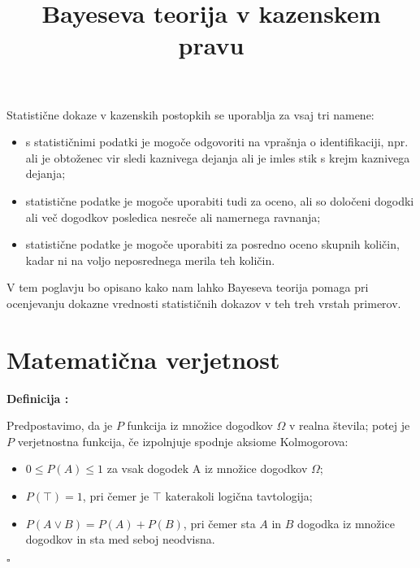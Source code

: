 \documentclass[a4paper,12pt]{article}
\newcounter{definicija}
\newenvironment{definicija}
{
   \stepcounter{definicija}
   \begin{flushleft}
   \textbf{Definicija \arabic{definicija}: }
}
{
   \hfill $\square$
   \end{flushleft}
}
\begin{document}
\title{Bayeseva teorija v kazenskem pravu}
\maketitle

Statistične dokaze v kazenskih postopkih se uporablja za vsaj tri namene:
\begin{itemize}
    \item s statističnimi podatki je mogoče odgovoriti na vprašnja o 
    identifikaciji, npr. ali je obtoženec vir sledi kaznivega dejanja ali je imles stik s krejm kaznivega dejanja;
    \item statistične podatke je mogoče uporabiti tudi za oceno, ali so določeni dogodki ali več dogodkov posledica nesreče ali namernega ravnanja;
    \item statistične podatke je mogoče uporabiti za posredno oceno skupnih količin, kadar ni na voljo neposrednega merila teh količin. 
\end{itemize}  
V tem poglavju bo opisano kako nam lahko Bayeseva teorija pomaga pri ocenjevanju dokazne vrednosti statističnih dokazov v teh treh vrstah primerov.

\section{Matematična verjetnost}
\begin{definicija}
Predpostavimo, da je $P$ funkcija iz množice dogodkov $\Omega$ v realna števila; potej je $P$ verjetnostna funkcija, če izpolnjuje spodnje aksiome Kolmogorova:\\
\begin{itemize}
    \item $0 \le P(A) \le 1$ za vsak dogodek A iz množice dogodkov $\Omega$;
    \item $P(\top)=1$, pri čemer je $\top$ katerakoli logična tavtologija;
    \item $P(A \vee B) = P(A) + P(B)$, pri čemer sta $A$ in $B$ dogodka iz množice dogodkov in sta med seboj neodvisna.
\end{itemize}
\end{definicija}
\end{document}
